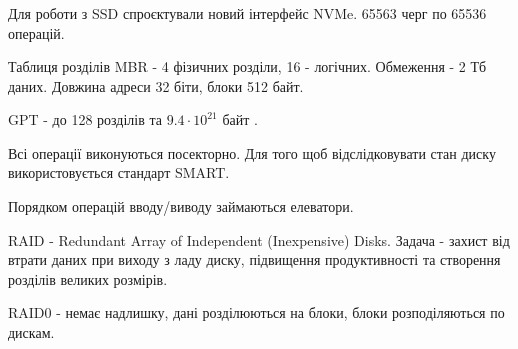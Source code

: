 \documentclass[t]{beamer}  %
\begin{document}
\begin{frame}
 	\frametitle{\insertsection} 
 	\framesubtitle{\insertsubsection}
Для роботи з SSD спроєктували новий інтерфейс NVMe. 65563 черг по 65536 операцій.

Таблиця розділів MBR - 4 фізичних розділи, 16 - логічних. Обмеження - 2 Тб даних. Довжина адреси 32 біти, блоки 512 байт.

GPT - до 128 розділів та $9.4\cdot 10^{21}$ байт .

Всі операції виконуються посекторно. Для того щоб відслідковувати стан диску використовується стандарт SMART.

Порядком операцій вводу/виводу займаються елеватори.

RAID - Redundant Array of Independent (Inexpensive) Disks. Задача - захист від втрати даних при виходу з ладу диску, підвищення продуктивності та створення розділів великих розмірів.

RAID0 - немає надлишку, дані розділюються  на блоки, блоки розподіляються по дискам.
\end{frame}
\end{document}
